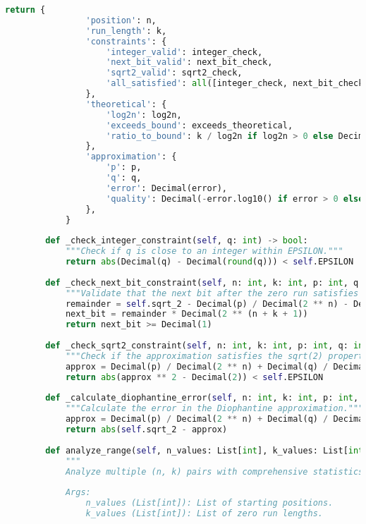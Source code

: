 \begin{lstlisting}[language=Python, style=pythonstyle, frame=single, caption={Zero Run Analysis Algorithm}]
            return {
                'position': n,
                'run_length': k,
                'constraints': {
                    'integer_valid': integer_check,
                    'next_bit_valid': next_bit_check,
                    'sqrt2_valid': sqrt2_check,
                    'all_satisfied': all([integer_check, next_bit_check, sqrt2_check]),
                },
                'theoretical': {
                    'log2n': log2n,
                    'exceeds_bound': exceeds_theoretical,
                    'ratio_to_bound': k / log2n if log2n > 0 else Decimal('inf'),
                },
                'approximation': {
                    'p': p,
                    'q': q,
                    'error': Decimal(error),
                    'quality': Decimal(-error.log10() if error > 0 else float('inf')),
                },
            }
    
        def _check_integer_constraint(self, q: int) -> bool:
            """Check if q is close to an integer within EPSILON."""
            return abs(Decimal(q) - Decimal(round(q))) < self.EPSILON
    
        def _check_next_bit_constraint(self, n: int, k: int, p: int, q: int) -> bool:
            """Validate that the next bit after the zero run satisfies constraints."""
            remainder = self.sqrt_2 - Decimal(p) / Decimal(2 ** n) - Decimal(q) / Decimal(2 ** (n + k))
            next_bit = remainder * Decimal(2 ** (n + k + 1))
            return next_bit >= Decimal(1)
    
        def _check_sqrt2_constraint(self, n: int, k: int, p: int, q: int) -> bool:
            """Check if the approximation satisfies the sqrt(2) property."""
            approx = Decimal(p) / Decimal(2 ** n) + Decimal(q) / Decimal(2 ** (n + k))
            return abs(approx ** 2 - Decimal(2)) < self.EPSILON
    
        def _calculate_diophantine_error(self, n: int, k: int, p: int, q: int) -> Decimal:
            """Calculate the error in the Diophantine approximation."""
            approx = Decimal(p) / Decimal(2 ** n) + Decimal(q) / Decimal(2 ** (n + k))
            return abs(self.sqrt_2 - approx)
    
        def analyze_range(self, n_values: List[int], k_values: List[int]) -> List[Dict]:
            """
            Analyze multiple (n, k) pairs with comprehensive statistics.
    
            Args:
                n_values (List[int]): List of starting positions.
                k_values (List[int]): List of zero run lengths.
    

\end{lstlisting}
